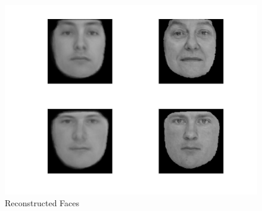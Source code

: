 \documentclass[12pt]{ctexart}
\begin{document}
\begin{enumerate}
\begin{figure}[H]
\includegraphics[scale=0.18]{c_rec_face_wf4.jpg}
  \caption{Reconstructed Faces}
\end{figure}


\end{enumerate}
\end{document}
